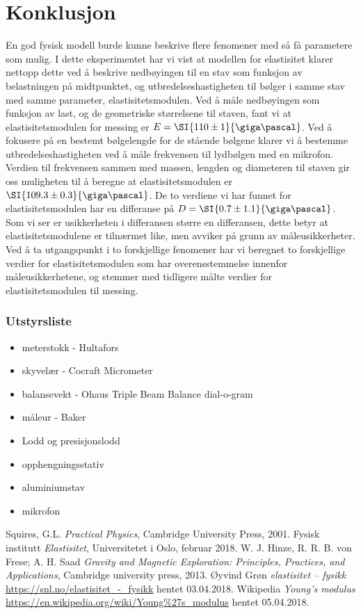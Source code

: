 \documentclass[%
 reprint,
nofootinbib,
aps,
]{revtex4-1}
\begin{document}
\section{Konklusjon}
En god fysisk modell burde kunne beskrive flere fenomener med så få parametere som mulig. I dette eksperimentet har vi vist at modellen for elastisitet klarer nettopp dette ved å beskrive nedbøyingen til en stav som funksjon av belastningen på midtpunktet, og utbredelseshastigheten til bølger i samme stav med samme parameter, elastisitetsmodulen.
Ved å måle nedbøyingen som funksjon av last, og de geometriske størrelsene til staven, fant vi at elastisitetsmodulen for messing er $E=\SI{110\pm1}{\giga\pascal}$.
Ved å fokusere på en bestemt bølgelengde for de stående bølgene klarer vi å bestemme utbredelseshastigheten ved å måle frekvensen til lydbølgen med en mikrofon. Verdien til frekvensen sammen med massen, lengden og diameteren til staven gir oss muligheten til å beregne at elastisitetsmodulen er $\SI{109.3\pm0.3}{\giga\pascal}$.
De to verdiene vi har funnet for elastisitetsmodulen har en differanse på $D = \SI{0.7\pm1.1}{\giga\pascal}$. Som vi ser er usikkerheten i differansen større en differansen, dette betyr at elastisitetsmodulene er tilnærmet like, men avviker på grunn av måleusikkerheter. Ved å ta utgangspunkt i to forskjellige fenomener har vi beregnet to forskjellige verdier for elastisitetsmodulen som har overensstemmelse innenfor måleusikkerhetene, og stemmer med tidligere målte verdier for elastisitetsmodulen til messing.
\subsubsection*{Utstyrsliste}
\begin{itemize}
\label{utstyr}
\item meterstokk - Hultafors
\item skyvelær - Cocraft Micrometer
\item balansevekt - Ohaus Triple Beam Balance dial-o-gram
\item måleur - Baker
\item Lodd og presisjonslodd
\item opphengningsstativ
\item aluminiumstav
\item mikrofon
\end{itemize}
\begin{thebibliography}{9}
Squires, G.L. \emph{Practical Physics}, Cambridge University Press, 2001.
Fysisk institutt \emph{Elastisitet}, Universitetet i Oslo, februar 2018.
W. J. Hinze, R. R. B. von Frese; A. H. Saad \emph{Gravity and Magnetic Exploration: Principles, Practices, and Applications}, Cambridge university press, 2013.
Øyvind Grøn \emph{elastisitet – fysikk} \url{https://snl.no/elastisitet_-_fysikk} hentet 03.04.2018.
Wikipedia \emph{Young's modulus} \url{https://en.wikipedia.org/wiki/Young%27s_modulus} hentet 05.04.2018.
\end{thebibliography}
\end{document}
